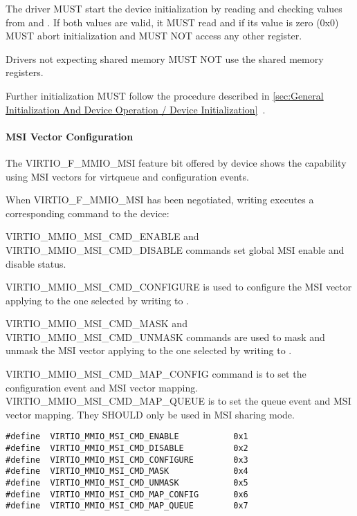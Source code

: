 
The driver MUST start the device initialization by reading and
checking values from  and .
If both values are valid, it MUST read 
and if its value is zero (0x0) MUST abort initialization and
MUST NOT access any other register.

Drivers not expecting shared memory MUST NOT use the shared
memory registers.

Further initialization MUST follow the procedure described in
\ref{sec:General Initialization And Device Operation / Device Initialization}~.

\paragraph{MSI Vector Configuration}\label{sec:Virtio Transport Options / Virtio Over MMIO / MMIO-specific Initialization And Device Operation / Device Initialization / MSI Vector Configuration}
The VIRTIO_F_MMIO_MSI feature bit offered by device shows the capability
using MSI vectors for virtqueue and configuration events.

When VIRTIO_F_MMIO_MSI has been negotiated,
writing  executes a corresponding command to the device:

VIRTIO_MMIO_MSI_CMD_ENABLE and VIRTIO_MMIO_MSI_CMD_DISABLE commands set global
MSI enable and disable status.

VIRTIO_MMIO_MSI_CMD_CONFIGURE is used to configure the MSI vector
applying to the one selected by writing to .

VIRTIO_MMIO_MSI_CMD_MASK and VIRTIO_MMIO_MSI_CMD_UNMASK commands are used to
mask and unmask the MSI vector applying to the one selected by writing
to .

VIRTIO_MMIO_MSI_CMD_MAP_CONFIG command is to set the configuration event and MSI vector
mapping. VIRTIO_MMIO_MSI_CMD_MAP_QUEUE is to set the queue event and MSI vector
mapping. They SHOULD only be used in MSI sharing mode.

\begin{lstlisting}
#define  VIRTIO_MMIO_MSI_CMD_ENABLE           0x1
#define  VIRTIO_MMIO_MSI_CMD_DISABLE          0x2
#define  VIRTIO_MMIO_MSI_CMD_CONFIGURE        0x3
#define  VIRTIO_MMIO_MSI_CMD_MASK             0x4
#define  VIRTIO_MMIO_MSI_CMD_UNMASK           0x5
#define  VIRTIO_MMIO_MSI_CMD_MAP_CONFIG       0x6
#define  VIRTIO_MMIO_MSI_CMD_MAP_QUEUE        0x7
\end{lstlisting}

